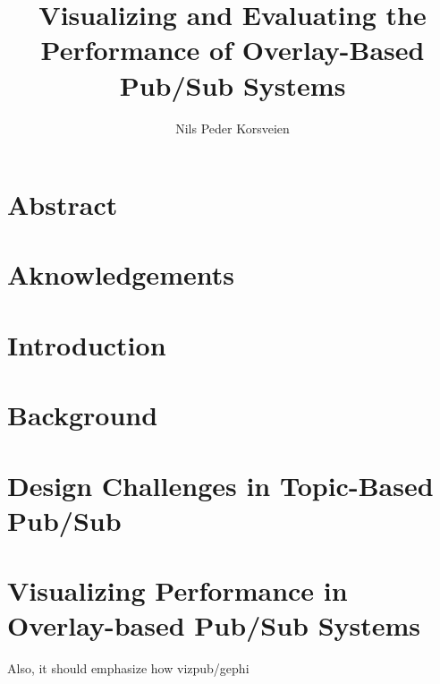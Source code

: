\documentclass[UKenglish, a4paper]{ifimaster}
\title{Visualizing and Evaluating the Performance of Overlay-Based Pub/Sub Systems}
\subtitle{}
\author{Nils Peder Korsveien}
\begin{document}
\ififorside{}
\frontmatter{}
\maketitle{}

\chapter*{Abstract}
\tableofcontents{}
\listoffigures{}
\listoftables{}
\chapter*{Aknowledgements}
\mainmatter{}

\chapter{Introduction}


\chapter{Background}
\label{ch:background}


\chapter{Design Challenges in Topic-Based Pub/Sub}
\label{ch:design-challenges}


\chapter{Visualizing Performance in Overlay-based Pub/Sub Systems}
 Also, it should emphasize how vizpub/gephi
\label{ch:vizpub}

\end{document}
